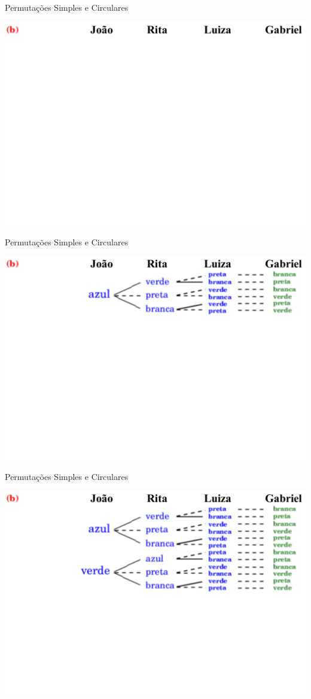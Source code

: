 \documentclass[aspectratio=169]{beamer}
\begin{document}
\begin{frame}{Permutações Simples e Circulares}
    \begin{center}
        \includegraphics[width=0.71\linewidth]{figs/Exemplo1b_1.png}
    \end{center}
\end{frame}

\begin{frame}{Permutações Simples e Circulares}
    \begin{center}
        \includegraphics[width=0.71\linewidth]{figs/Exemplo1b_2.png}
    \end{center}
\end{frame}

\begin{frame}{Permutações Simples e Circulares}
    \begin{center}
        \includegraphics[width=0.71\linewidth]{figs/Exemplo1b_3.png}
    \end{center}
\end{frame}
\end{document}
